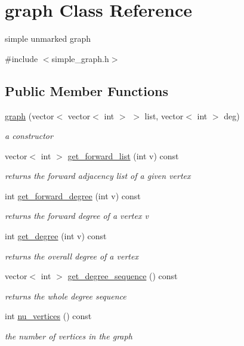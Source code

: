 \hypertarget{classgraph}{}\section{graph Class Reference}
\label{classgraph}


simple unmarked graph  




{\ttfamily \#include $<$simple\+\_\+graph.\+h$>$}

\subsection*{Public Member Functions}
\begin{DoxyCompactItemize}
\item 
\hyperlink{classgraph_a0f89acfea28c8996a0d8df4d07e6ecf2}{graph} (vector$<$ vector$<$ int $>$ $>$ list, vector$<$ int $>$ deg)
\begin{DoxyCompactList}\small\item\em a constructor \end{DoxyCompactList}\item 
vector$<$ int $>$ \hyperlink{classgraph_aa8fbee52a7b3604dbbd9175040c7ead5}{get\+\_\+forward\+\_\+list} (int v) const
\begin{DoxyCompactList}\small\item\em returns the forward adjacency list of a given vertex \end{DoxyCompactList}\item 
int \hyperlink{classgraph_a388b6ce292a4c49e3853e22bdce978de}{get\+\_\+forward\+\_\+degree} (int v) const
\begin{DoxyCompactList}\small\item\em returns the forward degree of a vertex v \end{DoxyCompactList}\item 
int \hyperlink{classgraph_a593245054bf5ded344fbf304bcdc7fbe}{get\+\_\+degree} (int v) const
\begin{DoxyCompactList}\small\item\em returns the overall degree of a vertex \end{DoxyCompactList}\item 
vector$<$ int $>$ \hyperlink{classgraph_afdca627df7fb93a7d1d8a547f616e948}{get\+\_\+degree\+\_\+sequence} () const
\begin{DoxyCompactList}\small\item\em returns the whole degree sequence \end{DoxyCompactList}\item 
int \hyperlink{classgraph_a70a6e0e4e0a874ab122405abd38f83cd}{nu\+\_\+vertices} () const
\begin{DoxyCompactList}\small\item\em the number of vertices in the graph \end{DoxyCompactList}\end{DoxyCompactItemize}
